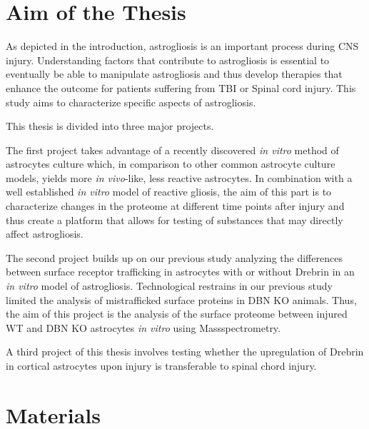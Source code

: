 \documentclass[a4paper,11pt,bibtotocnumbered]{article}
\begin{document}





\newpage
\section{Aim of the Thesis}

As depicted in the introduction, astrogliosis is an important process during CNS injury. Understanding factors that contribute to astrogliosis is essential to eventually be able to manipulate astrogliosis and thus develop therapies that enhance the outcome for patients suffering from TBI or Spinal cord injury. This study aims to characterize specific aspects of astrogliosis.
 
This thesis is divided into three major projects.

The first project takes advantage of a recently discovered \textit{in vitro} method of astrocytes culture which, in comparison to other common astrocyte culture models, yields more \textit{in vivo}-like, less reactive astrocytes. In combination with a well established \textit{in vitro} model of reactive gliosis, the aim of this part is to characterize changes in the proteome at different time points after injury and thus create a platform that allows for testing of substances that may directly affect astrogliosis.

The second project builds up on our previous study analyzing the differences between surface receptor trafficking in astrocytes with or without Drebrin in an \textit{in vitro} model of astrogliosis. Technological restrains in our previous 
study limited the analysis of mistrafficked surface proteins in DBN KO animals. Thus, the aim of this project is the analysis of the surface proteome between injured WT and DBN KO astrocytes \textit{in vitro} using Massspectrometry.

A third project of this thesis involves testing whether the upregulation of Drebrin in cortical astrocytes upon injury is transferable to spinal chord injury.


\newpage
\section{Materials}
\end{document}

